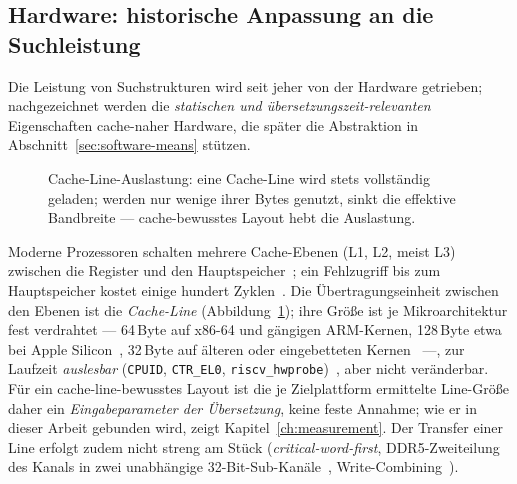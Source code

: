\begin{nurkurz}
\section{Hardware: historische Anpassung an die Suchleistung}\label{sec:hardware-history}
Die Leistung von Suchstrukturen wird seit jeher von der Hardware getrieben; nachgezeichnet werden die
\emph{statischen und übersetzungszeit-relevanten} Eigenschaften cache-naher Hardware, die später die Abstraktion
in Abschnitt~\ref{sec:software-means} stützen.
\begin{figure}[htbp]\centering
{}
\caption{Cache-Line-Auslastung: eine Cache-Line wird stets vollständig geladen; werden nur wenige ihrer Bytes genutzt, sinkt die effektive Bandbreite --- cache-bewusstes Layout hebt die Auslastung.}\label{fig:cache-line}
\end{figure}
Moderne Prozessoren schalten mehrere Cache-Ebenen (L1, L2, meist L3) zwischen die Register und den
Hauptspeicher~\cite{hennessy2019architecture}; ein Fehlzugriff bis zum Hauptspeicher kostet einige hundert
Zyklen~\cite{drepper2007memory}. Die Übertragungseinheit zwischen den Ebenen ist die \emph{Cache-Line}
(Abbildung~\ref{fig:cache-line}); ihre Größe ist je Mikroarchitektur fest verdrahtet --- 64\,Byte
auf x86-64 und gängigen ARM-Kernen, 128\,Byte etwa bei Apple Silicon~\cite{apple_optimization}, 32\,Byte auf älteren
oder eingebetteten Kernen~\cite{hennessy2019architecture,intel_optimization,amd_sog} ---, zur Laufzeit
\emph{auslesbar} (\texttt{CPUID}, \texttt{CTR\_EL0}, \texttt{riscv\_hwprobe})~\cite{arm_arm,intel_sdm,linux_riscv_hwprobe},
aber nicht veränderbar. Für ein cache-line-bewusstes Layout ist die je Zielplattform ermittelte Line-Größe daher
ein \emph{Eingabeparameter der Übersetzung}, keine feste Annahme; wie er in dieser Arbeit gebunden wird, zeigt
Kapitel~\ref{ch:measurement}. Der Transfer einer Line erfolgt zudem nicht streng am Stück
(\emph{critical-word-first}, DDR5-Zweiteilung des Kanals in zwei unabhängige 32-Bit-Sub-Kanäle~\cite{micron_ddr5},
Write-Combining~\cite{intel_sdm}).
\end{nurkurz}

